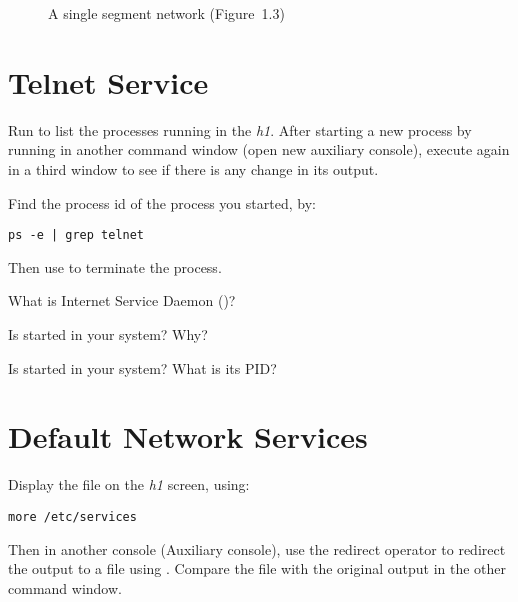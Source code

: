 \documentclass{../UTNetLab}
\begin{document}
\begin{center}
\begin{minipage}{0.48\textwidth}
\begin{flushright}
\begin{figure}[H]
                    \caption{A single segment network (Figure~1.3)}
                \end{figure}
            \end{flushright}
        \end{minipage}
    \end{center}

\section{Telnet Service}
    Run  to list the processes running in the \textit{h1}.
    After starting a new process by running  in another command window (open new auxiliary console), execute  again in a third window to see if there is any change in its output.

    Find the process id of the  process you started, by:
    \begin{lstlisting}
ps -e | grep telnet
    \end{lstlisting}
    Then use  to terminate the  process.
    
    \begin{report}
        \item What is Internet Service Daemon ()?

        \item Is  started in your system? Why?

        \item Is  started in your system? What is its PID?
    \end{report}

\section{Default Network Services}
    Display the file  on the \textit{h1} screen, using:
    \begin{lstlisting}
more /etc/services
    \end{lstlisting}
    Then in another console (Auxiliary console), use the redirect operator to redirect the  output to
    a file using .
    Compare the file  with the original  output in the other command window.
\end{document}
